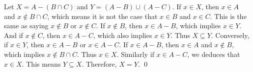   {Let
  \(X = A - (B \cap C)\) and \(Y = (A-B) \cup (A-C)\).  If
  \(x \in X\), then \(x \in A\) and \(x \notin B \cap C\), which means
  it is not the case that \(x \in B\) and \(x \in C\).  This is the
  same as saying \(x \notin B\) or \(x \notin C\).  If \(x \notin B\),
  then \(x \in A-B\), which implies \(x \in Y\).  And if
  \(x \notin C\), then \(x \in A-C\), which also implies \(x \in Y\).
  Thus \(X \subseteq Y\).  Conversely, if \(x \in Y\), then
  \(x \in A-B\) or \(x \in A-C\).  If \(x \in A-B\), then \(x \in A\)
  and \(x \notin B\), which implies \(x \notin B \cap C\).  Thus
  \(x \in X\).  Similarly if \(x \in A-C\), we deduces that
  \(x \in X\).  This means \(Y \subseteq X\).  Therefore, \(X =
  Y\). \qed}



